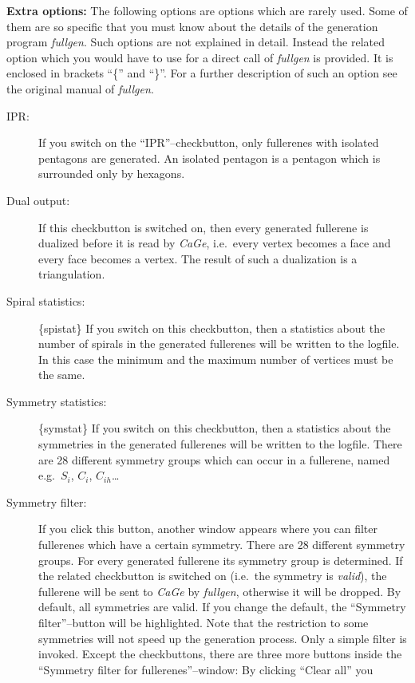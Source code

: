 \documentclass[a4paper]{article}
\def\CaGe{\textit{CaGe}}
\begin{document}
\vspace{3mm}

\noindent
\textbf{Extra options:} The following options are options which are rarely
used. Some of them are so specific that you must know about the details of the
generation program \textit{fullgen}. Such options are not explained in detail.
Instead the related option which you would have to use for a direct call of 
\textit{fullgen} is provided. It is enclosed in brackets ``\{'' and ``\}''.
For a further description of such an option see the original manual of
\textit{fullgen}.
\begin{description}
\item[IPR:] If you switch on the ``IPR''--checkbutton, only fullerenes with
isolated pentagons are generated. An isolated pentagon is a pentagon which is
surrounded only by hexagons.
\item[Dual output:] If this checkbutton is switched on, then every generated
fullerene is dualized before it is read by \CaGe{}, i.e.~every vertex becomes
a face and every face becomes a vertex. The result of such a dualization is a 
triangulation.
\item[Spiral statistics:] \{spistat\} If you switch on this checkbutton, 
then a statistics about the number of spirals in the generated fullerenes will
be written to the logfile. In this case the minimum and the maximum number of
vertices must be the same.
\item[Symmetry statistics:] \{symstat\} If you switch on this checkbutton,
then a statistics about the symmetries in the generated fullerenes will be
written to the logfile. There are 28 different symmetry groups which can occur
in a fullerene, named e.g.~$S_i$, $C_i$, $C_{ih}$\ldots
\item[Symmetry filter:] If you click this button, another window appears
where you can filter fullerenes which have a certain symmetry. There are 28
different symmetry groups. For every generated fullerene its symmetry group
is determined. If the related checkbutton is switched on (i.e.~the symmetry is
\textit{valid}), the fullerene will
be sent to \CaGe{} by \textit{fullgen}, otherwise it will be dropped. By
default, all symmetries are valid. If you change the default, the 
``Symmetry filter''--button will be highlighted. Note that the restriction to
some symmetries will not speed up the generation process. Only a simple filter
is invoked. Except the checkbuttons,
there are three more buttons inside the 
``Symmetry filter for fullerenes''--window: By clicking ``Clear all'' you

\end{description}
\end{document}
